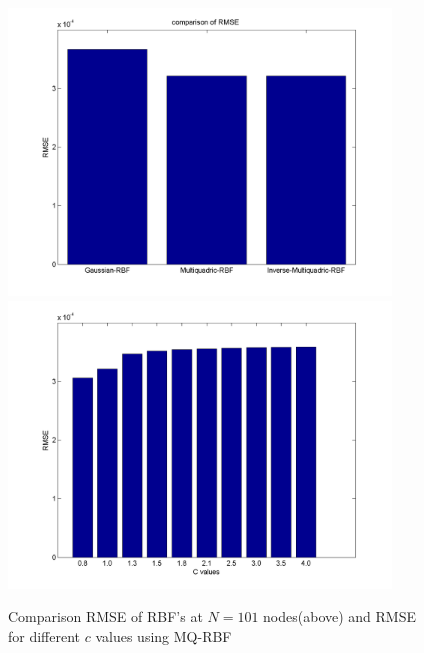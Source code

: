 \documentclass[12pt]{article}
\numberwithin{equation}{section} %
\begin{document}
\newpage
 \begin{figure}[h]
\begin{centering}
\vskip -0.5in
\includegraphics*[height=3in]{barmse.png}\
\includegraphics*[height=3in]{CMQ.png}\
\caption{Comparison RMSE of RBF's at $N=101$ nodes(above) and RMSE
for different $c$ values using MQ-RBF} \vskip -0.5in
\end{centering}
\end{figure}
\end{document}
